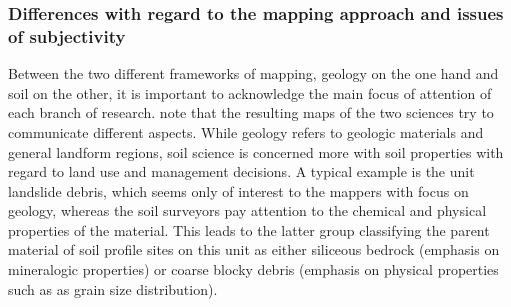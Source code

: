 \documentclass[preprint,12pt,authoryear]{elsarticle}
\begin{document}
\subsubsection{Differences with regard to the mapping approach and issues of subjectivity}
Between the two different frameworks of mapping, geology on the one hand and soil on the other, it is important to acknowledge the main focus of attention of each branch of research. \cite{Miller2015a} note that the resulting maps of the two sciences try to communicate different aspects. While geology refers to geologic materials and general landform regions, soil science is concerned more with soil properties with regard to land use and management decisions. A typical example is the unit landslide debris, which seems only of interest to the mappers with focus on geology, whereas the soil surveyors pay attention to the chemical and physical properties of the material. This leads to the latter group classifying the parent material of soil profile sites on this unit as either siliceous bedrock (emphasis on mineralogic properties) or coarse blocky debris (emphasis on  physical properties such as as grain size distribution).
\end{document}
